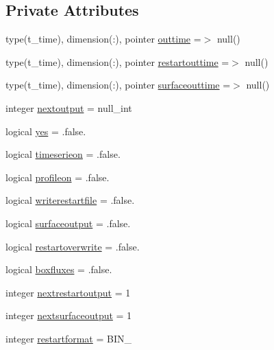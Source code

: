 \subsection*{Private Attributes}
\begin{DoxyCompactItemize}
\item 
type(t\+\_\+time), dimension(\+:), pointer \mbox{\hyperlink{structmoduleporousmedia_1_1t__output_a074f9423218c6622a3ba676abbde165d}{outtime}} =$>$ null()
\item 
type(t\+\_\+time), dimension(\+:), pointer \mbox{\hyperlink{structmoduleporousmedia_1_1t__output_a99ad215103cab2b26e31d91991b0dca8}{restartouttime}} =$>$ null()
\item 
type(t\+\_\+time), dimension(\+:), pointer \mbox{\hyperlink{structmoduleporousmedia_1_1t__output_a117a9515557bbfbb80d5efa48a4b0c7a}{surfaceouttime}} =$>$ null()
\item 
integer \mbox{\hyperlink{structmoduleporousmedia_1_1t__output_a0e877bf673c653da182f594a746d6e3f}{nextoutput}} = null\+\_\+int
\item 
logical \mbox{\hyperlink{structmoduleporousmedia_1_1t__output_a2e187cedd75d8e0d4f241119285b7688}{yes}} = .false.
\item 
logical \mbox{\hyperlink{structmoduleporousmedia_1_1t__output_aac00b6e26ebc7e441ca1ccc630edb644}{timeserieon}} = .false.
\item 
logical \mbox{\hyperlink{structmoduleporousmedia_1_1t__output_a0897b28eb3be09d5dc63ea975aff9ec4}{profileon}} = .false.
\item 
logical \mbox{\hyperlink{structmoduleporousmedia_1_1t__output_afea65e6ec460dd9b720bc0ef3d214b02}{writerestartfile}} = .false.
\item 
logical \mbox{\hyperlink{structmoduleporousmedia_1_1t__output_a22ee0403b5567d06caecc855a6ce71b1}{surfaceoutput}} = .false.
\item 
logical \mbox{\hyperlink{structmoduleporousmedia_1_1t__output_a2db8076f976a3727478e33c7207d5cdd}{restartoverwrite}} = .false.
\item 
logical \mbox{\hyperlink{structmoduleporousmedia_1_1t__output_a035e99dfd7c648b8f4c5a8835a5b6adc}{boxfluxes}} = .false.
\item 
integer \mbox{\hyperlink{structmoduleporousmedia_1_1t__output_a65b8370230c2eff18e44d5918127917b}{nextrestartoutput}} = 1
\item 
integer \mbox{\hyperlink{structmoduleporousmedia_1_1t__output_ab48576633073ceb6fa02e478faaba494}{nextsurfaceoutput}} = 1
\item 
integer \mbox{\hyperlink{structmoduleporousmedia_1_1t__output_a7077b14d514c38550873165011f8599d}{restartformat}} = B\+I\+N\+\_\+
\end{DoxyCompactItemize}


